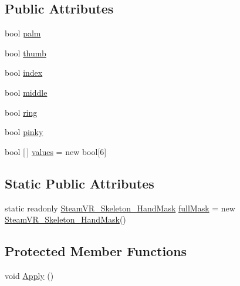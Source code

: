 \subsection*{Public Attributes}
\begin{DoxyCompactItemize}
\item 
bool \mbox{\hyperlink{class_valve_1_1_v_r_1_1_steam_v_r___skeleton___hand_mask_aefc2d71605f909a3dede0c06f09b5f46}{palm}}
\item 
bool \mbox{\hyperlink{class_valve_1_1_v_r_1_1_steam_v_r___skeleton___hand_mask_a16b652297306bd275181a367ef47653b}{thumb}}
\item 
bool \mbox{\hyperlink{class_valve_1_1_v_r_1_1_steam_v_r___skeleton___hand_mask_ad0f8344c5d0ee046db536ce55b8b2ca5}{index}}
\item 
bool \mbox{\hyperlink{class_valve_1_1_v_r_1_1_steam_v_r___skeleton___hand_mask_a674861a37e06342db5bc4cba71fd7f3e}{middle}}
\item 
bool \mbox{\hyperlink{class_valve_1_1_v_r_1_1_steam_v_r___skeleton___hand_mask_abb610921f263420908b19148ff2ac5f6}{ring}}
\item 
bool \mbox{\hyperlink{class_valve_1_1_v_r_1_1_steam_v_r___skeleton___hand_mask_a549d573f7344f4a009d3deb8f03ac25d}{pinky}}
\item 
bool \mbox{[}$\,$\mbox{]} \mbox{\hyperlink{class_valve_1_1_v_r_1_1_steam_v_r___skeleton___hand_mask_ae092b0a9900a67ac5d988363fa21ea47}{values}} = new bool\mbox{[}6\mbox{]}
\end{DoxyCompactItemize}
\subsection*{Static Public Attributes}
\begin{DoxyCompactItemize}
\item 
static readonly \mbox{\hyperlink{class_valve_1_1_v_r_1_1_steam_v_r___skeleton___hand_mask}{Steam\+V\+R\+\_\+\+Skeleton\+\_\+\+Hand\+Mask}} \mbox{\hyperlink{class_valve_1_1_v_r_1_1_steam_v_r___skeleton___hand_mask_ae704ddd65cd4b256f45fbf64de99be96}{full\+Mask}} = new \mbox{\hyperlink{class_valve_1_1_v_r_1_1_steam_v_r___skeleton___hand_mask}{Steam\+V\+R\+\_\+\+Skeleton\+\_\+\+Hand\+Mask}}()
\end{DoxyCompactItemize}
\subsection*{Protected Member Functions}
\begin{DoxyCompactItemize}
\item 
void \mbox{\hyperlink{class_valve_1_1_v_r_1_1_steam_v_r___skeleton___hand_mask_a6729c2bbc27a22e51db3c407c7c3c228}{Apply}} ()
\end{DoxyCompactItemize}



